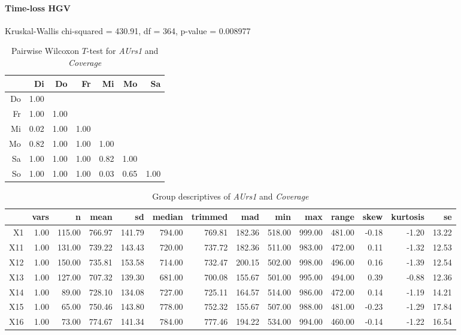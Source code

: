 \paragraph{Time-loss HGV}
Kruskal-Wallis chi-squared = 430.91, df = 364, p-value = 0.008977

\begin{table}[ht]
	\small
	\centering
    \begin{tabular}{rrrrrrr}
		\hline
		& Di & Do & Fr & Mi & Mo & Sa \\ 
		\hline
		Do & 1.00 &  &  &  &  &  \\ 
		Fr & 1.00 & 1.00 &  &  &  &  \\ 
		Mi & 0.02 & 1.00 & 1.00 &  &  &  \\ 
		Mo & 0.82 & 1.00 & 1.00 & 1.00 &  &  \\ 
		Sa & 1.00 & 1.00 & 1.00 & 0.82 & 1.00 &  \\ 
		So & 1.00 & 1.00 & 1.00 & 0.03 & 0.65 & 1.00 \\ 
		\hline
	\end{tabular}
    \caption{Pairwise Wilcoxon $T$-test for \textit{AUrs1} and \textit{Coverage}}
    \label{tbl:wilcoxon_baysis_effector_AUrs1_Cov}
\end{table}
\begin{table}[ht]
	\small
	\centering
    \begin{tabular}{rrrrrrrrrrrrrr}
		\hline
		& vars & n & mean & sd & median & trimmed & mad & min & max & range & skew & kurtosis & se \\ 
		\hline
		X1 & 1.00 & 115.00 & 766.97 & 141.79 & 794.00 & 769.81 & 182.36 & 518.00 & 999.00 & 481.00 & -0.18 & -1.20 & 13.22 \\ 
		X11 & 1.00 & 131.00 & 739.22 & 143.43 & 720.00 & 737.72 & 182.36 & 511.00 & 983.00 & 472.00 & 0.11 & -1.32 & 12.53 \\ 
		X12 & 1.00 & 150.00 & 735.81 & 153.58 & 714.00 & 732.47 & 200.15 & 502.00 & 998.00 & 496.00 & 0.16 & -1.39 & 12.54 \\ 
		X13 & 1.00 & 127.00 & 707.32 & 139.30 & 681.00 & 700.08 & 155.67 & 501.00 & 995.00 & 494.00 & 0.39 & -0.88 & 12.36 \\ 
		X14 & 1.00 & 89.00 & 728.10 & 134.08 & 727.00 & 725.11 & 164.57 & 514.00 & 986.00 & 472.00 & 0.14 & -1.19 & 14.21 \\ 
		X15 & 1.00 & 65.00 & 750.46 & 143.80 & 778.00 & 752.32 & 155.67 & 507.00 & 988.00 & 481.00 & -0.23 & -1.29 & 17.84 \\ 
		X16 & 1.00 & 73.00 & 774.67 & 141.34 & 784.00 & 777.46 & 194.22 & 534.00 & 994.00 & 460.00 & -0.14 & -1.22 & 16.54 \\ 
		\hline
	\end{tabular}
    \caption{Group descriptives of \textit{AUrs1} and \textit{Coverage}}
    \label{tbl:descriptives_baysis_effector_AUrs1_Cov}
\end{table}

